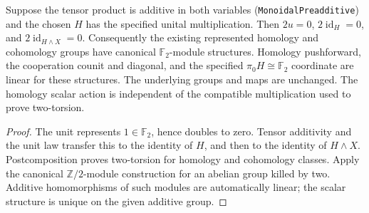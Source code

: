 \begin{proposition}
  \label{prop:h6-derived-mod2-scalars}
  \leanok
  Suppose the tensor product is additive in both variables
  (\texttt{MonoidalPreadditive}) and the chosen $H$ has the specified
  unital multiplication. Then $2u=0$, $2\operatorname{id}_H=0$, and
  $2\operatorname{id}_{H\wedge X}=0$. Consequently the existing represented
  homology and cohomology groups have canonical $\mathbb F_2$-module
  structures. Homology pushforward, the cooperation counit and diagonal,
  and the specified $\pi_0H\cong\mathbb F_2$ coordinate are linear for these
  structures. The underlying groups and maps are unchanged. The homology
  scalar action is independent of the compatible multiplication used to
  prove two-torsion.
\end{proposition}
\begin{proof}
  The unit represents $1\in\mathbb F_2$, hence doubles to zero. Tensor
  additivity and the unit law transfer this to the identity of $H$, and
  then to the identity of $H\wedge X$. Postcomposition proves two-torsion
  for homology and cohomology classes. Apply the canonical
  $\mathbb Z/2$-module construction for an abelian group killed by two.
  Additive homomorphisms of such modules are automatically linear; the
  scalar structure is unique on the given additive group.
  \leanok
\end{proof}

